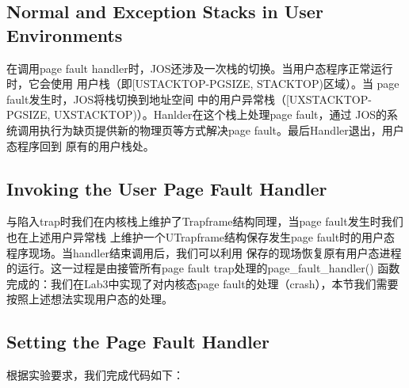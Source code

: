 \documentclass[12pt, letterpaper]{report}
\begin{document}
\subsection{Normal and Exception Stacks in User Environments}
在调用page fault handler时，JOS还涉及一次栈的切换。当用户态程序正常运行时，它会使用
用户栈（即[USTACKTOP-PGSIZE, STACKTOP)区域）。当 page fault发生时，JOS将栈切换到地址空间
中的用户异常栈（[UXSTACKTOP-PGSIZE, UXSTACKTOP)）。Hanlder在这个栈上处理page fault，通过
JOS的系统调用执行为缺页提供新的物理页等方式解决page fault。最后Handler退出，用户态程序回到
原有的用户栈处。
\subsection{Invoking the User Page Fault Handler}
与陷入trap时我们在内核栈上维护了Trapframe结构同理，当page fault发生时我们也在上述用户异常栈
上维护一个UTrapframe结构保存发生page fault时的用户态程序现场。当handler结束调用后，我们可以利用
保存的现场恢复原有用户态进程的运行。这一过程是由接管所有page fault trap处理的page\_fault\_handler()
函数完成的：我们在Lab3中实现了对内核态page fault的处理（crash），本节我们需要按照上述想法实现用户态的处理。\par

\subsection{Setting the Page Fault Handler}
根据实验要求，我们完成代码如下：
\end{document}
